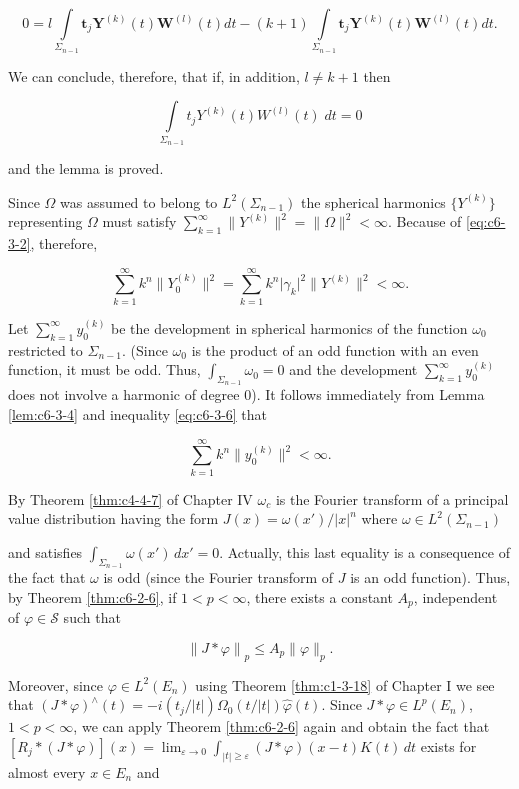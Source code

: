 \[
0=l\int\limits_{\Sigma_{n-1}}\boldsymbol{t}_{j}\boldsymbol{Y}^{(k)}(t)\boldsymbol{W}^{(l)}(t)d t-(k+1)\int\limits_{\Sigma_{n-1}}\boldsymbol{t}_{j}\boldsymbol{Y}^{(k)}(t)\boldsymbol{W}^{(l)}(t)d t.
\]

We can conclude, therefore, that if, in addition, $l \neq k + 1$ then

\[
\int\limits_{\Sigma_{n-1}}t_{j}Y^{(k)}(t)W^{(l)}(t)\;d t=0
\]

and the lemma is proved.

Since $\Omega$ was assumed to belong to $L^2(\Sigma_{n-1})$ the spherical harmonics $\{Y^{(k)}\}$ representing $\Omega$ must satisfy $\sum_{k=1}^{\infty} \| Y^{(k)} \|^2 = \|\Omega\|^2 < \infty$. Because of \eqref{eq:c6-3-2}, therefore,

\begin{equation}\label{eq:c6-3-6}
\sum_{k=1}^{\infty}k^{n}\big\|Y_{0}^{(k)}\big\|^{2}=\sum_{k=1}^{\infty}k^{n}\big|\gamma_{k}\big|^{2}\big\|Y^{(k)}\big\|^{2}<\infty.
\end{equation}

Let $\sum_{k=1}^{\infty} y_{0}^{(k)}$ be the development in spherical harmonics of the function $\omega_{0}$ restricted to $\Sigma_{n-1}$. (Since $\omega_{0}$ is the product of an odd function with an even function, it must be odd. Thus, $\int_{\Sigma_{n-1}} \omega_{0} = 0$ and the development $\sum_{k=1}^{\infty} y_{0}^{(k)}$ does not involve a harmonic of degree 0). It follows immediately from Lemma \ref{lem:c6-3-4} and inequality \eqref{eq:c6-3-6} that

\[
\sum_{k=1}^{\infty}k^{n}\|y_{0}^{(k)}\|^{2}<\infty.
\]

By Theorem \ref{thm:c4-4-7} of Chapter IV $\omega_c$ is the Fourier transform of a principal value distribution having the form $J(x) = \omega(x')/|x|^n$ where $\omega \in L^2(\Sigma_{n-1})$

and satisfies $\int_{\Sigma_{n-1}} \omega(x') \, dx' = 0$. Actually, this last equality is a consequence of the fact that $\omega$ is odd (since the Fourier transform of $J$ is an odd function). Thus, by Theorem \ref{thm:c6-2-6}, if $1 < p < \infty$, there exists a constant $A_p$, independent of $\varphi \in \mathcal{S}$ such that

\[
\left\|J*\varphi\right\|_{p}\leq A_{p}\|\varphi\|_{p}.
\]

Moreover, since $\varphi \in L^2(E_n)$ using Theorem \ref{thm:c1-3-18} of Chapter I we see that $(J * \varphi)^\wedge(t) = -i (t_j/|t|) \Omega_0(t/|t|)\hat{\varphi}(t)$. Since $J * \varphi \in L^p(E_n)$, $1 < p < \infty$, we can apply Theorem \ref{thm:c6-2-6} again and obtain the fact that $[R_j * (J * \varphi)](x) = \lim_{\varepsilon \to 0} \int_{|t| \geq \varepsilon} (J * \varphi)(x - t) K(t) \, dt$ exists for almost every $x \in E_n$ and

